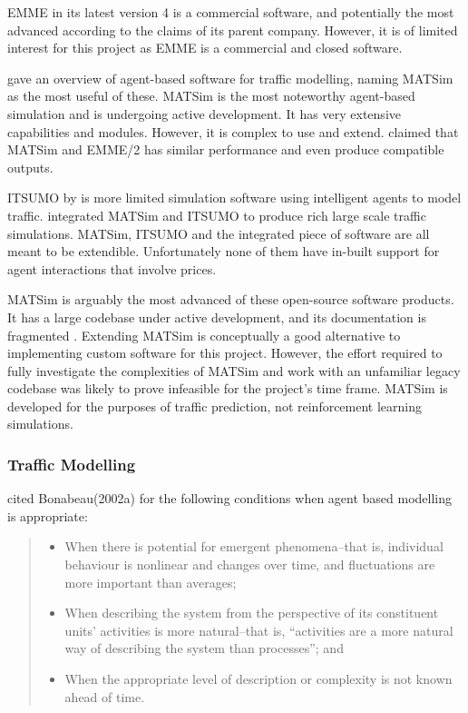 EMME in its latest version 4 is a commercial software, and potentially the most
advanced according to the claims of its parent company. However, it is of
limited interest for this project as EMME is a commercial and closed software.
\parencite{Inro2014emme}

\textcite{Bernhardt2007taxi+agent} gave an overview of agent-based software for
traffic modelling, naming MATSim as the most useful of these. MATSim is the
most noteworthy agent-based simulation and is undergoing active development. It
has very extensive capabilities and modules. However, it is complex to use and
extend. \textcite{Gao2010taxi+comparison} claimed that MATSim and EMME/2 has
similar performance and even produce compatible outputs.

ITSUMO by \textcite{Silva2006itsumo} is more limited simulation software using
intelligent agents to model traffic. \textcite{Bazzan2009integrating}
integrated  MATSim and ITSUMO to produce rich large scale traffic simulations.
MATSim, ITSUMO and the integrated piece of software are all meant to be
extendible. Unfortunately none of them have in-built support for agent
interactions that involve prices.

MATSim is arguably the most advanced of these open-source software products. It
has a large codebase under active development, and its documentation is
fragmented \textcite{Matsim2012}. Extending MATSim is conceptually a good
alternative to implementing custom software for this project. However, the
effort required to fully investigate the complexities of MATSim and work with
an unfamiliar legacy codebase was likely to prove infeasible for the project's
time frame. MATSim is developed for the purposes of traffic prediction, not
reinforcement learning simulations.


\subsubsection{Traffic Modelling}
\label{sec:literature:related:modelling}

\textcite[78]{Bernhardt2007taxi+agent} cited Bonabeau(2002a) for the following
conditions when agent based modelling is appropriate:

\begin{quote}
\begin{itemize}
  \item When there is potential for emergent phenomena--that is, individual 
  behaviour is nonlinear and changes over time, and fluctuations are more 
  important than averages;
  \item When describing the system from the perspective of its constituent 
  units’ activities is more natural--that is, “activities are a more natural way
  of describing the system than processes”; and
  \item When the appropriate level of description or complexity is not known 
  ahead of time.
\end{itemize}
\end{quote}

